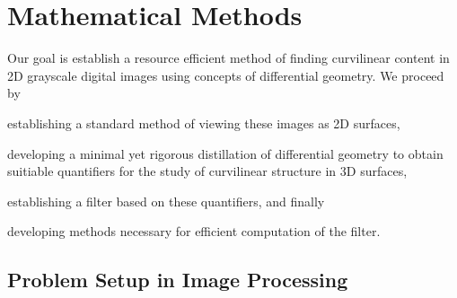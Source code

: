 \chapter{Mathematical Methods} \label{ch:mathematical-methods}

%
%
%
%
% 
%
%
%


Our goal is establish a resource efficient method of finding curvilinear content in 2D grayscale digital images using concepts of differential geometry. We proceed by
\begin{enumerate*}[label=(\roman*)]
	\item establishing a standard method of viewing these images as 2D surfaces,
	\item developing a minimal yet rigorous distillation of differential geometry
			to obtain suitiable quantifiers
			for the study of curvilinear structure in 3D surfaces,
	\item establishing a filter based on these quantifiers,
	and finally
	\item developing methods necessary for efficient computation of the filter.
\end{enumerate*}

\section{Problem Setup in Image Processing}\label{sec:image-processing-setup}

